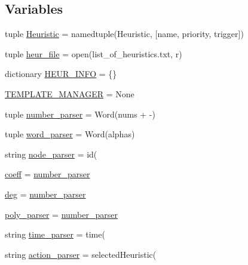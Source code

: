 \subsection*{Variables}
\begin{DoxyCompactItemize}
\item 
tuple \hyperlink{namespaceeqn__viz_a0e6b1a683d662dd566b0cece84265fae}{Heuristic} = namedtuple(\textquotesingle{}Heuristic\textquotesingle{}, \mbox{[}\textquotesingle{}name\textquotesingle{}, \textquotesingle{}priority\textquotesingle{}, \textquotesingle{}trigger\textquotesingle{}\mbox{]})
\item 
tuple \hyperlink{namespaceeqn__viz_a1bea532f61715c9742cbbe0bef8e5121}{heur\+\_\+file} = open(\textquotesingle{}list\+\_\+of\+\_\+heuristics.\+txt\textquotesingle{}, \textquotesingle{}r\textquotesingle{})
\item 
dictionary \hyperlink{namespaceeqn__viz_a8017c4f105a541309fcf639e7925a88b}{H\+E\+U\+R\+\_\+\+I\+N\+F\+O} = \{\}
\item 
\hyperlink{namespaceeqn__viz_af2da9273cfc3d8dc9ce1f05558cbc838}{T\+E\+M\+P\+L\+A\+T\+E\+\_\+\+M\+A\+N\+A\+G\+E\+R} = None
\item 
tuple \hyperlink{namespaceeqn__viz_a5e65c3435a54324008033d990d858e72}{number\+\_\+parser} = Word(nums + \textquotesingle{}-\/\textquotesingle{})
\item 
tuple \hyperlink{namespaceeqn__viz_ad9dc00d4b3c0b288d0f204937297b179}{word\+\_\+parser} = Word(alphas)
\item 
string \hyperlink{namespaceeqn__viz_aa3f9b7373809e0e391e1383fd878b616}{node\+\_\+parser} = \textquotesingle{}id(\textquotesingle{}
\item 
\hyperlink{namespaceeqn__viz_ae1292d980053c2a15be129430ee3ebb1}{coeff} = \hyperlink{namespaceeqn__viz_a5e65c3435a54324008033d990d858e72}{number\+\_\+parser}
\item 
\hyperlink{namespaceeqn__viz_a1376f5d1deece596253f6876d746a500}{deg} = \hyperlink{namespaceeqn__viz_a5e65c3435a54324008033d990d858e72}{number\+\_\+parser}
\item 
\hyperlink{namespaceeqn__viz_aa45f3f597ca3ecacab90d141137afe1c}{poly\+\_\+parser} = \hyperlink{namespaceeqn__viz_a5e65c3435a54324008033d990d858e72}{number\+\_\+parser}
\item 
string \hyperlink{namespaceeqn__viz_a7bf2f0fb75b2d7a493e3ebf9cf2f580e}{time\+\_\+parser} = \textquotesingle{}time(\textquotesingle{}
\item 
string \hyperlink{namespaceeqn__viz_ab821f1efc209d98cc2cbfce1f818acbc}{action\+\_\+parser} = \textquotesingle{}selected\+Heuristic(\textquotesingle{}

\end{DoxyCompactItemize}
